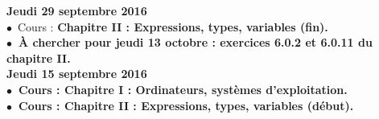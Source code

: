 \documentclass[12pt,a4paper]{article}
\begin{document}
%   
%  
%  
%  
\noindent\textbf{\bf Jeudi 29 septembre 2016 \rm}\\
$\bullet$\ Cours :  \bf Chapitre II \rm : Expressions, types, variables (fin).\\
$\bullet$\ À chercher pour jeudi 13 octobre : exercices 6.0.2 et 6.0.11 du chapitre 
II.\vspace{.4cm}\\

\noindent\textbf{\bf Jeudi 15 septembre 2016 \rm}\\
$\bullet$\ Cours :  \bf Chapitre I \rm : Ordinateurs, systèmes d'exploitation.\vspace{.4cm}\\
$\bullet$\ Cours :  \bf Chapitre II \rm : Expressions, types, variables (début).\vspace{.4cm}\\


\label{end}
\end{document}
